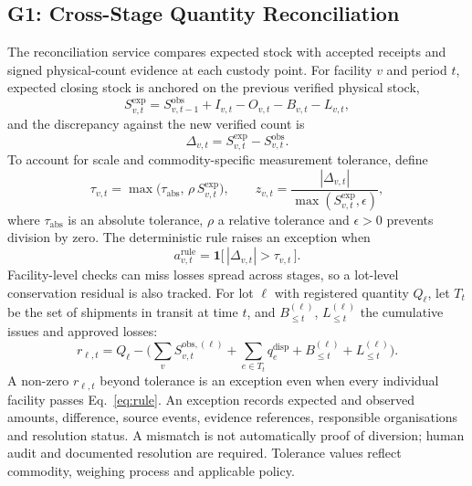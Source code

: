 \documentclass[conference,a4paper]{IEEEtran}
\newcommand{\ind}{\mathbf{1}}
\newcommand{\qdisp}{q^{\mathrm{disp}}}
\begin{document}
\subsection{G1: Cross-Stage Quantity Reconciliation}
The reconciliation service compares expected stock with accepted receipts and signed physical-count evidence at each custody point. For facility $v$ and period $t$, expected closing stock is anchored on the previous verified physical stock,
\begin{equation}
S^{\mathrm{exp}}_{v,t}=S^{\mathrm{obs}}_{v,t-1}+I_{v,t}-O_{v,t}-B_{v,t}-L_{v,t},
\label{eq:exp}
\end{equation}
and the discrepancy against the new verified count is
\begin{equation}
\Delta_{v,t}=S^{\mathrm{exp}}_{v,t}-S^{\mathrm{obs}}_{v,t}.
\label{eq:delta}
\end{equation}
To account for scale and commodity-specific measurement tolerance, define
\begin{equation}
\tau_{v,t}=\max\!\big(\tau_{\mathrm{abs}},\,\rho\,S^{\mathrm{exp}}_{v,t}\big),\qquad
z_{v,t}=\frac{|\Delta_{v,t}|}{\max(S^{\mathrm{exp}}_{v,t},\epsilon)},
\label{eq:tau}
\end{equation}
where $\tau_{\mathrm{abs}}$ is an absolute tolerance, $\rho$ a relative tolerance and $\epsilon>0$ prevents division by zero. The deterministic rule raises an exception when
\begin{equation}
a^{\mathrm{rule}}_{v,t}=\ind\big[\,|\Delta_{v,t}|>\tau_{v,t}\,\big].
\label{eq:rule}
\end{equation}
Facility-level checks can miss losses spread across stages, so a lot-level conservation residual is also tracked. For lot $\ell$ with registered quantity $Q_\ell$, let $T_t$ be the set of shipments in transit at time $t$, and $B^{(\ell)}_{\le t}$, $L^{(\ell)}_{\le t}$ the cumulative issues and approved losses:
\begin{equation}
r_{\ell,t}=Q_\ell-\Big(\sum_v S^{\mathrm{obs},(\ell)}_{v,t}+\sum_{e\in T_t}\qdisp_e+B^{(\ell)}_{\le t}+L^{(\ell)}_{\le t}\Big).
\label{eq:resid}
\end{equation}
A non-zero $r_{\ell,t}$ beyond tolerance is an exception even when every individual facility passes Eq.~\eqref{eq:rule}. An exception records expected and observed amounts, difference, source events, evidence references, responsible organisations and resolution status. A mismatch is not automatically proof of diversion; human audit and documented resolution are required. Tolerance values reflect commodity, weighing process and applicable policy.
\end{document}
